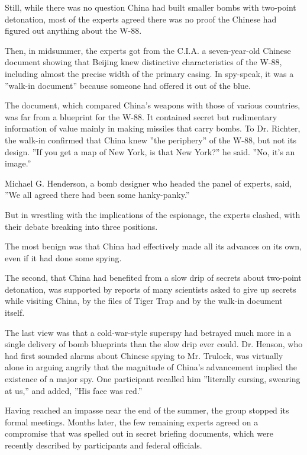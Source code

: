 Still, while there was no question China had built smaller bombs with
two-point detonation, most of the experts agreed there was no proof the
Chinese had figured out anything about the W-88.

Then, in midsummer, the experts got from the C.I.A. a seven-year-old
Chinese document showing that Beijing knew distinctive characteristics
of the W-88, including almost the precise width of the primary casing.
In spy-speak, it was a ''walk-in document'' because someone had offered
it out of the blue.

The document, which compared China's weapons with those of various
countries, was far from a blueprint for the W-88. It contained secret
but rudimentary information of value mainly in making missiles that
carry bombs. To Dr. Richter, the walk-in confirmed that China knew ''the
periphery'' of the W-88, but not its design. ''If you get a map of New
York, is that New York?'' he said. ''No, it's an image.''

Michael G. Henderson, a bomb designer who headed the panel of experts,
said, ''We all agreed there had been some hanky-panky.''

But in wrestling with the implications of the espionage, the experts
clashed, with their debate breaking into three positions.

The most benign was that China had effectively made all its advances on
its own, even if it had done some spying.

The second, that China had benefited from a slow drip of secrets about
two-point detonation, was supported by reports of many scientists asked
to give up secrets while visiting China, by the files of Tiger Trap and
by the walk-in document itself.

The last view was that a cold-war-style superspy had betrayed much more
in a single delivery of bomb blueprints than the slow drip ever could.
Dr. Henson, who had first sounded alarms about Chinese spying to Mr.
Trulock, was virtually alone in arguing angrily that the magnitude of
China's advancement implied the existence of a major spy. One
participant recalled him ''literally cursing, swearing at us,'' and
added, ''His face was red.''

Having reached an impasse near the end of the summer, the group stopped
its formal meetings. Months later, the few remaining experts agreed on a
compromise that was spelled out in secret briefing documents, which were
recently described by participants and federal officials.

